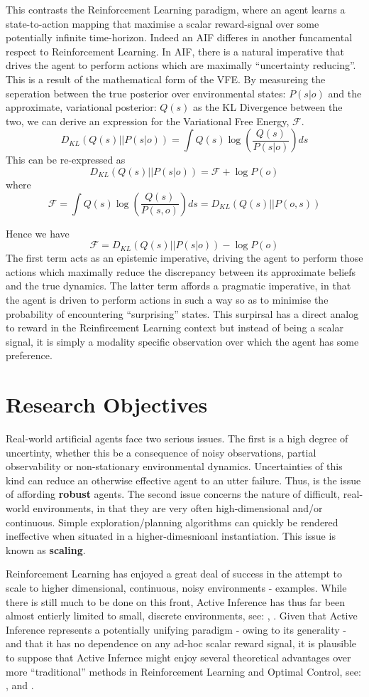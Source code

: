 \documentclass[12pt, twoside]{report}
\begin{document}
This contrasts the Reinforcement Learning paradigm, where an agent learns a state-to-action mapping that maximise a scalar reward-signal over some potentially infinite time-horizon.
Indeed an AIF differes in another funcamental respect to Reinforcement Learning. In AIF, there is a natural imperative that drives the agent to perform actions which are maximally ``uncertainty reducing''. This is a result of the mathematical form of the VFE. By measureing the seperation between the true posterior over environmental states: $P(s|o)$ and the approximate, variational posterior: $Q(s)$ as the KL Divergence between the two, we can derive an expression for the Variational Free Energy, $\mathcal{F}$. $$D_{KL}(Q(s) || P(s|o)) = \int Q(s)\log(\frac{Q(s)}{P(s | o)})ds$$ This can be re-expressed as $$D_{KL}(Q(s) || P(s|o)) = \mathcal{F} + \log{P(o)}$$ where $$\mathcal{F} = \int Q(s)\log(\frac{Q(s)}{P(s, o)})ds = D_{KL}(Q(s) || P(o, s))$$

Hence we have $$\mathcal{F}  = D_{KL}(Q(s) || P(s|o)) - \log{P(o)}$$ The first term acts as an epistemic imperative, driving the agent to perform those actions which maximally reduce the discrepancy between its approximate beliefs and the true dynamics. The latter term affords a pragmatic imperative, in that the agent is driven to perform actions in such a way so as to minimise the probability of encountering ``surprising'' states. This surpirsal has a direct analog to reward in the Reinfircement Learning context but instead of being a scalar signal, it is simply a modality specific observation over which the agent has some preference.  


\section{Research Objectives}
Real-world artificial agents face two serious issues. The first is a high degree of uncertinty, whether this be a consequence of noisy observations, partial observability or non-stationary environmental dynamics. Uncertainties of this kind can reduce an otherwise effective agent to an utter failure. Thus, is the issue of affording \textbf{robust} agents. The second issue concerns the nature of difficult, real-world environments, in that they are very often high-dimensional and/or continuous. Simple exploration/planning algorithms can quickly be rendered ineffective when situated in a higher-dimesnioanl instantiation. This issue is known as \textbf{scaling}.

Reinforcement Learning has enjoyed a great deal of success in the attempt to scale to higher dimensional, continuous, noisy environments - examples. While there is still much to be done on this front, Active Inference has thus far been almost entierly limited to small, discrete environments, see: \textcite{AIF-D}, \textcite{AIF-Cur-Insight}. Given that Active Inference represents a potentially unifying paradigm - owing to its generality - and that it has no dependence on any ad-hoc scalar reward signal, it is plausible to suppose that Active Infernce might enjoy several theoretical advantages over more ``traditional'' methods in Reinforcement Learning and Optimal Control, see: \textcite{RL-or-AIF}, \textcite{Friston2012} and \textcite{Optim-Motor}.   
\end{document}
